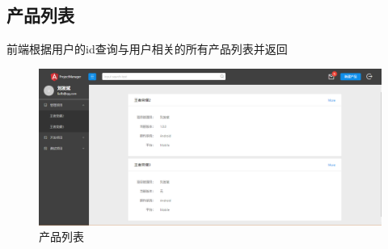 \subsection{产品列表}
前端根据用户的id查询与用户相关的所有产品列表并返回
\begin{figure}[h]
	\centering
	\includegraphics[width=\textwidth]{image/result/list.png}
	\caption{产品列表}
	\label{fig:list}
\end{figure}
